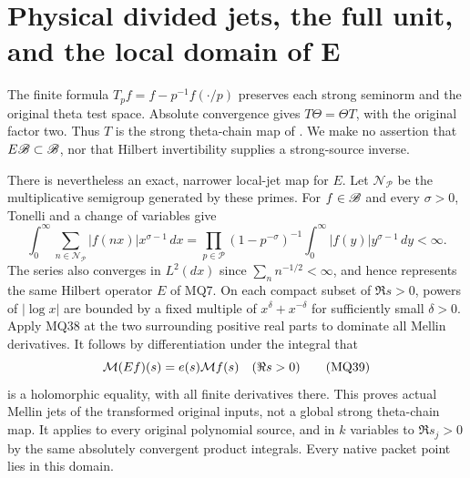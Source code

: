 \documentclass[11pt]{article}
\begin{document}
\section{Physical divided jets, the full unit, and the local domain of E}
The finite formula $T_pf=f-p^{-1}f(\cdot/p)$ preserves each
strong seminorm and the original theta test space. Absolute
convergence gives $T\Theta=\Theta T$, with the original factor
two. Thus $T$ is the strong theta-chain map of \cite{swmix:SD}.
We make no assertion that $E\mathscr B\subset\mathscr B$, nor that Hilbert
invertibility supplies a strong-source inverse.

There is nevertheless an exact, narrower local-jet map for $E$.
Let $\mathcal N_{\mathcal P}$ be the multiplicative semigroup
generated by these primes. For $f\in\mathscr B$ and every $\sigma>0$,
Tonelli and a change of variables give
\[
 \int_0^\infty\sum_{n\in\mathcal N_{\mathcal P}}
 |f(nx)|x^{\sigma-1}\,dx
 =\prod_{p\in\mathcal P}(1-p^{-\sigma})^{-1}
       \int_0^\infty|f(y)|y^{\sigma-1}\,dy<\infty.           \tag{MQ38}
\]
The series also converges in $L^2(dx)$ since
$\sum_n n^{-1/2}<\infty$, and hence represents the same Hilbert
operator $E$ of MQ7. On each compact subset of $\Re s>0$, powers
of $|\log x|$ are bounded by a fixed multiple of
$x^\delta+x^{-\delta}$ for sufficiently small $\delta>0$.
Apply MQ38 at the two surrounding positive real parts to dominate
all Mellin derivatives. It follows by differentiation under the
integral that
\[
 \mathcal M(Ef)(s)=e(s)\mathcal M f(s)\quad(\Re s>0)                      \tag{MQ39}
\]
is a holomorphic equality, with all finite derivatives there. This
proves actual Mellin jets of the transformed original inputs,
not a global strong theta-chain map. It applies to every original
polynomial source, and in $k$ variables to $\Re s_j>0$ by the
same absolutely convergent product integrals. Every native packet
point lies in this domain.
\end{document}

